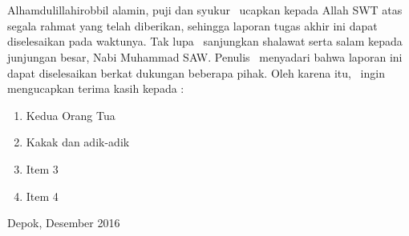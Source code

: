 \chapter*{\kataPengantar}

Alhamdulillahirobbil alamin, puji dan syukur \saya~ucapkan kepada Allah SWT atas segala rahmat yang telah diberikan, sehingga laporan tugas akhir ini dapat diselesaikan pada waktunya. Tak lupa \saya~sanjungkan shalawat serta salam kepada junjungan besar, Nabi Muhammad SAW. Penulis \saya~menyadari bahwa laporan ini dapat diselesaikan berkat dukungan beberapa pihak. Oleh karena itu, \saya~ingin mengucapkan terima kasih kepada :

\begin{enumerate}
	\item Kedua Orang Tua \saya
	\item Kakak dan adik-adik \saya
	\item Item 3
	\item Item 4
	
\end{enumerate}
\vspace*{0.1cm}
\begin{flushright}
	Depok, Desember 2016\\[0.1cm]
	\vspace*{1cm}
	\penulis
	
\end{flushright}